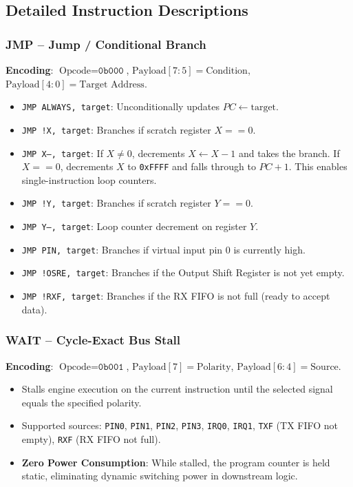 \documentclass[11pt,a4paper]{article}
\begin{document}
\subsection{Detailed Instruction Descriptions}

\subsubsection{JMP -- Jump / Conditional Branch}
\textbf{Encoding}: $\text{Opcode} = \texttt{0b000}$, $\text{Payload}[7:5] = \text{Condition}$, $\text{Payload}[4:0] = \text{Target Address}$.
\begin{itemize}
    \item \texttt{JMP ALWAYS, target}: Unconditionally updates $PC \leftarrow \text{target}$.
    \item \texttt{JMP !X, target}: Branches if scratch register $X == 0$.
    \item \texttt{JMP X--, target}: If $X \ne 0$, decrements $X \leftarrow X - 1$ and takes the branch. If $X == 0$, decrements $X$ to \texttt{0xFFFF} and falls through to $PC + 1$. This enables single-instruction loop counters.
    \item \texttt{JMP !Y, target}: Branches if scratch register $Y == 0$.
    \item \texttt{JMP Y--, target}: Loop counter decrement on register $Y$.
    \item \texttt{JMP PIN, target}: Branches if virtual input pin 0 is currently high.
    \item \texttt{JMP !OSRE, target}: Branches if the Output Shift Register is not yet empty.
    \item \texttt{JMP !RXF, target}: Branches if the RX FIFO is not full (ready to accept data).
\end{itemize}

\subsubsection{WAIT -- Cycle-Exact Bus Stall}
\textbf{Encoding}: $\text{Opcode} = \texttt{0b001}$, $\text{Payload}[7] = \text{Polarity}$, $\text{Payload}[6:4] = \text{Source}$.
\begin{itemize}
    \item Stalls engine execution on the current instruction until the selected signal equals the specified polarity.
    \item Supported sources: \texttt{PIN0}, \texttt{PIN1}, \texttt{PIN2}, \texttt{PIN3}, \texttt{IRQ0}, \texttt{IRQ1}, \texttt{TXF} (TX FIFO not empty), \texttt{RXF} (RX FIFO not full).
    \item \textbf{Zero Power Consumption}: While stalled, the program counter is held static, eliminating dynamic switching power in downstream logic.
\end{itemize}
\end{document}
